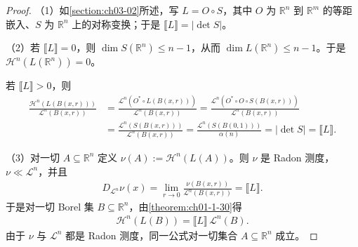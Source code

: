 \documentclass[../../main.tex]{subfiles}%
\begin{document}
\begin{proof}
（1）如\cref{section:ch03-02}所述，写 $L=O\circ S$，其中 $O$ 为 $\mathbb{R}^n$ 到 $\mathbb{R}^m$ 的等距嵌入、$S$ 为 $\mathbb{R}^n$ 上的对称变换；于是 $\llbracket L\rrbracket=\lvert\det S\rvert$。%

（2）若 $\llbracket L\rrbracket=0$，则 $\dim S(\mathbb{R}^n)\leqslant n-1$，从而 $\dim L(\mathbb{R}^n)\leqslant n-1$。于是 $\mathcal{H}^n(L(\mathbb{R}^n))=0$。

若 $\llbracket L\rrbracket>0$，则
\begin{align*}
\frac{\mathcal{H}^n(L(B(x,r)))}{\mathcal{L}^n(B(x,r))}
&=\frac{\mathcal{L}^n(O^{*}\circ L(B(x,r)))}{\mathcal{L}^n(B(x,r))}
=\frac{\mathcal{L}^n(O^{*}\circ O\circ S(B(x,r)))}{\mathcal{L}^n(B(x,r))}\\
&=\frac{\mathcal{L}^n(S(B(x,r)))}{\mathcal{L}^n(B(x,r))}
=\frac{\mathcal{L}^n(S(B(0,1)))}{\alpha(n)}
=\lvert\det S\rvert=\llbracket L\rrbracket .
\end{align*}

（3）对一切 $A\subseteq\mathbb{R}^n$ 定义 $\nu(A):=\mathcal{H}^n(L(A))$。则 $\nu$ 是 Radon 测度，$\nu\ll\mathcal{L}^n$，并且
\begin{align*}
D_{\mathcal{L}^n}\nu(x)=\lim_{r\to0}\frac{\nu(B(x,r))}{\mathcal{L}^n(B(x,r))}=\llbracket L\rrbracket .
\end{align*}
于是对一切 Borel 集 $B\subseteq\mathbb{R}^n$，由\cref{theorem:ch01-1-30}得%
\begin{align*}
\mathcal{H}^n(L(B))=\llbracket L\rrbracket\,\mathcal{L}^n(B).
\end{align*}
由于 $\nu$ 与 $\mathcal{L}^n$ 都是 Radon 测度，同一公式对一切集合 $A\subseteq\mathbb{R}^n$ 成立。
\end{proof}
\end{document}
